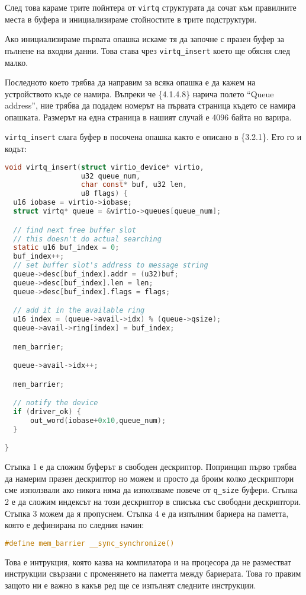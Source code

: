 След това караме трите пойнтера от {\tt virtq} структурата да сочат към правилните места в буфера и инициализираме стойностите в трите подструктури.

Ако инициализираме първата опашка искаме тя да започне с празен буфер за пълнене на входни данни. Това става чрез {\tt virtq\_insert} което ще обясня след малко.

Последното което трябва да направим за всяка опашка е да кажем на устройството къде се намира. Въпреки че \{4.1.4.8\} нарича полето ``Queue address'', ние трябва да подадем номерът на първата страница където се намира опашката. Размерът на една страница в нашият случай е 4096 байта но варира.

{\tt virtq\_insert} слага буфер в посочена опашка както е описано в \{3.2.1\}. Ето го и кодът:
\begin{lstlisting}[language=C]
void virtq_insert(struct virtio_device* virtio,
                  u32 queue_num,
                  char const* buf, u32 len,
                  u8 flags) {
  u16 iobase = virtio->iobase;
  struct virtq* queue = &virtio->queues[queue_num];

  // find next free buffer slot
  // this doesn't do actual searching
  static u16 buf_index = 0;
  buf_index++;
  // set buffer slot's address to message string
  queue->desc[buf_index].addr = (u32)buf;
  queue->desc[buf_index].len = len;
  queue->desc[buf_index].flags = flags;

  // add it in the available ring
  u16 index = (queue->avail->idx) % (queue->qsize);
  queue->avail->ring[index] = buf_index;

  mem_barrier;

  queue->avail->idx++;

  mem_barrier;

  // notify the device
  if (driver_ok) {
      out_word(iobase+0x10,queue_num);
  }

}
\end{lstlisting}
Стъпка 1 е да сложим буферът в свободен дескриптор. Попринцип първо трябва да намерим празен дескриптор но можем и просто да броим колко дескриптори сме използвали ако никога няма да използваме повече от {\tt q\_size} буфери. Стъпка 2 е да сложим индексът на този дескриптор в списъка със свободни дескриптори. Стъпка 3 можем да я пропуснем. Стъпка 4 е да изпълним бариера на паметта, която е дефинирана по следния начин:
\begin{lstlisting}[language=C]
#define mem_barrier __sync_synchronize()
\end{lstlisting}
Това е интрукция, която казва на компилатора и на процесора да не разместват инструкции свързани с променянето на паметта между бариерата. Това го правим защото ни е важно в какъв ред ще се изпълнят следните инструкции.


